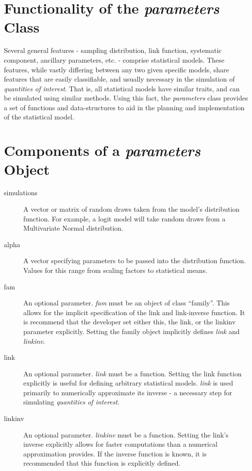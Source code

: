 \section{Functionality of the \emph{parameters} Class}

Several general features - sampling distribution, link function,
systematic component, ancillary parameters, etc. - comprise
statistical models.  These features, while vastly differing between
any two given specific models, share features that are easily
classifiable, and usually necessary in the simulation of
\emph{quantities of interest}.  That is, all statistical models have
similar traits, and can be simulated using similar methods.  Using
this fact, the \emph{parameters} class provides a set of functions
and data-structures to aid in the planning and implementation of 
the statistical model.


\section{Components of a \emph{parameters} Object}

\begin{description}
	\item[simulations] A vector or matrix of random draws taken from
		the model's distribution function.  For example, a logit model
		will take random draws from a Multivariate Normal distribution.
		
	\item[alpha] A vector specifying parameters to be passed into
		the distribution function.  Values for this range from scaling
		factors to statistical means.
	
	\item[fam] An optional parameter.  \emph{fam} must be an object
		of class ``family''.  This allows for the implicit specification
		of the link and link-inverse function.  It is recommend that the
		developer set either this, the link, or the linkinv parameter
		explicitly.  Setting the family object implicitly defines
		\emph{link} and \emph{linkinv}.
		
	\item[link] An optional parameter.  \emph{link} must be a function.
		Setting the link function explicitly is useful for defining
		arbitrary statistical models.  \emph{link} is used primarily to
		numerically approximate its inverse - a necessary step for
		simulating \emph{quantities of interest}.
		
	\item[linkinv] An optional parameter.  \emph{linkinv} must be a
		function.  Setting the link's inverse explicitly allows for faster
		computations than a numerical approximation provides.  If the
		inverse function is known, it is recommended that this function
		is explicitly defined.
		
\end{description}

